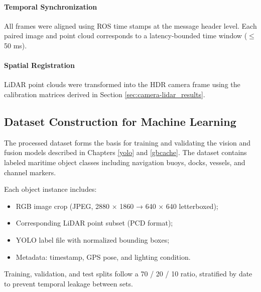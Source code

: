 \documentclass{erauthesis}
\begin{document}
\paragraph{Temporal Synchronization}  
All frames were aligned using ROS time stamps at the message header level.  
Each paired image and point cloud corresponds to a latency-bounded time window ($\le$ 50 ms).  

\paragraph{Spatial Registration}  
LiDAR point clouds were transformed into the HDR camera frame using the calibration matrices 
derived in Section \ref{sec:camera-lidar_results}.  

\subsection{Dataset Construction for Machine Learning}
\label{sec:dataset_construction}

The processed dataset forms the basis for training and validating the vision and fusion models described in Chapters \ref{yolo} and \ref{gbcache}.  
The dataset contains labeled maritime object classes including navigation buoys, docks, vessels, and channel markers.  

Each object instance includes:
\begin{itemize}[noitemsep,leftmargin=1.5em]
    \item RGB image crop (JPEG, 2880 × 1860 → 640 × 640 letterboxed);
    \item Corresponding LiDAR point subset (PCD format);
    \item YOLO label file with normalized bounding boxes;
    \item Metadata: timestamp, GPS pose, and lighting condition.
\end{itemize}

Training, validation, and test splits follow a 70 / 20 / 10 ratio, stratified by date to prevent temporal leakage between sets.  



\end{document}
